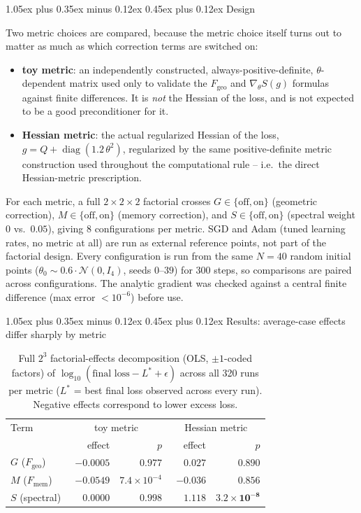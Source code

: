 \documentclass[10pt,twocolumn]{article}
\makeatletter
\renewcommand\subsection{\@startsection{subsection}{2}{0pt}%
  {1.05ex plus 0.35ex minus 0.12ex}%
  {0.45ex plus 0.12ex}%
  {\normalsize\bfseries}}
\makeatother
\begin{document}
\subsection{Design}

Two metric choices are compared, because the metric choice itself turns out to
matter as much as which correction terms are switched on:
\begin{itemize}
\item \textbf{toy metric}: an independently constructed,
  always-positive-definite, $\theta$-dependent matrix used only to
  validate the $F_{\mathrm{geo}}$ and $\nabla_\theta S(g)$ formulas against
  finite differences. It is \emph{not} the Hessian of the loss, and is not expected to be a
  good preconditioner for it.
\item \textbf{Hessian metric}: the actual regularized Hessian of
  the loss, $g=Q+\operatorname{diag}(1.2\,\theta^2)$, regularized by the same
  positive-definite metric construction used throughout the computational rule --
  i.e.\ the direct Hessian-metric prescription.
\end{itemize}
For each metric, a full $2\times2\times2$ factorial crosses
$G\in\{\text{off},\text{on}\}$ (geometric correction),
$M\in\{\text{off},\text{on}\}$ (memory correction), and
$S\in\{\text{off},\text{on}\}$ (spectral weight $0$ vs.\ $0.05$), giving 8
configurations per metric. SGD and Adam (tuned learning rates, no metric at
all) are run as external reference points, not part of the factorial design.
Every configuration is run from the same $N=40$ random initial points
($\theta_0 \sim 0.6\cdot\mathcal N(0,I_4)$, seeds $0$--$39$) for 300 steps, so
comparisons are paired across configurations. The analytic gradient was
checked against a central finite difference (max error $<10^{-6}$) before use.

\subsection{Results: average-case effects differ sharply by metric}

\begin{table}[t]
\centering
\caption{Full $2^3$ factorial-effects decomposition (OLS, $\pm1$-coded
factors) of $\log_{10}(\text{final loss}-L^\ast+\epsilon)$ across all 320
runs per metric ($L^\ast$ = best final loss observed across every run).
Negative effects correspond to lower excess loss.}
\label{tab:factorial-effects}
\begin{tabular}{@{}lrrrr@{}}
\toprule
Term & \multicolumn{2}{c}{toy metric} & \multicolumn{2}{c}{Hessian metric} \\
 & effect & $p$ & effect & $p$ \\
\midrule
$G$ ($F_{\mathrm{geo}}$)   & $-0.0005$ & $0.977$ & $\phantom{-}0.027$ & $0.890$ \\
$M$ ($F_{\mathrm{mem}}$)   & $-0.0549$ & $7.4\times10^{-4}$ & $-0.036$ & $0.856$ \\
$S$ (spectral)             & $\phantom{-}0.0000$ & $0.998$ & $\phantom{-}\mathbf{1.118}$ & $\mathbf{3.2\times10^{-8}}$ \\
\bottomrule
\end{tabular}
\end{table}
\end{document}

